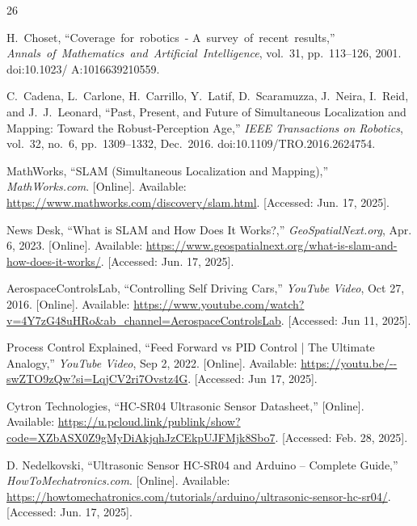 \renewcommand{\bibname}{References} %

\begin{thebibliography}{26}

H.~Choset, ``Coverage~for~robotics~- A~survey~of~recent~results,'' \textit{Annals~of~Mathematics~and~Artificial~Intelligence}, vol.~31, pp.~113--126, 2001. doi:10.1023/ A:1016639210559.

C.~Cadena, L.~Carlone, H.~Carrillo, Y.~Latif, D.~Scaramuzza, J.~Neira, I.~Reid, and J.~J.~Leonard,
``Past, Present, and Future of Simultaneous Localization and Mapping: Toward the Robust-Perception Age,''
\textit{IEEE Transactions on Robotics}, vol.~32, no.~6, pp.~1309--1332, Dec.~2016.
doi:10.1109/TRO.2016.2624754.

MathWorks, ``SLAM (Simultaneous Localization and Mapping),'' \textit{MathWorks.com}. [Online]. Available: \url{https://www.mathworks.com/discovery/slam.html}. [Accessed: Jun. 17, 2025].

News Desk, ``What is SLAM and How Does It Works?,'' \textit{GeoSpatialNext.org}, Apr. 6, 2023. [Online]. Available: \url{https://www.geospatialnext.org/what-is-slam-and-how-does-it-works/}. [Accessed: Jun. 17, 2025].

AerospaceControlsLab, ``Controlling Self Driving Cars,'' \textit{YouTube Video}, Oct 27, 2016. [Online]. Available: \url{https://www.youtube.com/watch?v=4Y7zG48uHRo&ab_channel=AerospaceControlsLab}. [Accessed: Jun 11, 2025].

Process Control Explained, ``Feed Forward vs PID Control | The Ultimate Analogy,'' \textit{YouTube Video}, Sep 2, 2022. [Online]. Available: \url{https://youtu.be/--swZTO9zQw?si=LqjCV2ri7Ovstz4G}. [Accessed: Jun 17, 2025].

Cytron Technologies, ``HC-SR04 Ultrasonic Sensor Datasheet,'' [Online]. Available: \url{https://u.pcloud.link/publink/show?code=XZbASX0Z9gMyDiAkjqhJzCEkpUJFMjk8Sbo7}. [Accessed: Feb. 28, 2025].

D. Nedelkovski, ``Ultrasonic Sensor HC-SR04 and Arduino -- Complete Guide,'' \textit{HowToMechatronics.com}. [Online]. Available: \url{https://howtomechatronics.com/tutorials/arduino/ultrasonic-sensor-hc-sr04/}. [Accessed: Jun. 17, 2025].


\end{thebibliography}
